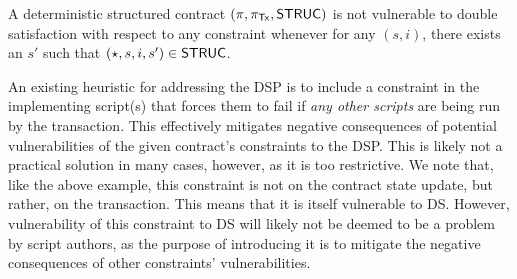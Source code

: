 A deterministic structured contract $(\pi, \pi_{\mathsf{Tx}}, \mathsf{STRUC})$
is not vulnerable to double satisfaction with respect to any
constraint whenever for any $(s, i)$, there exists
an $s'$ such that $(\star, s, i, s') \in \mathsf{STRUC}$. \newline

An existing heuristic for addressing the DSP
is to include a constraint in the implementing script(s)
that forces them to fail if \emph{any other scripts} are being run by the transaction.
This effectively mitigates negative consequences of potential vulnerabilities
of the given contract's constraints to the DSP. This is likely not a practical solution in many
cases, however, as it is too restrictive.
We note that, like the above example, this constraint is not on the
contract state update, but rather,
on the transaction. This means that it is itself vulnerable to DS. However,
vulnerability of this constraint to DS will likely not be deemed to be a problem
by script authors, as the purpose of introducing it is to mitigate the negative consequences of
other constraints' vulnerabilities.
